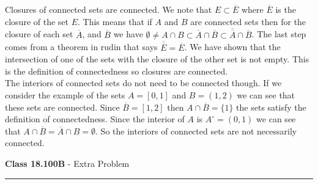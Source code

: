 \documentclass[11pt,reqno]{article}
\begin{document}
Closures of connected sets are connected. We note that  $E \subset \overline{E}$ where $\overline{E}$ is the closure of the set $E$. This means that if $A$ and $B$ are connected sets then for the closure of each set $\overline{A}$, and $\overline{B}$ we have $\emptyset \neq A \cap B \subset \overline{A} \cap \overline{B} \subset \overline{\overline{A}} \cap \overline{B}$. The last step comes from a theorem in rudin that says $\overline{\overline{E}} = \overline{E}$. We have shown that the intersection of one of the sets with the closure of the other set is not empty. This is the definition of connectedness so closures are connected.\\
\indent The interiors of connected sets do not need to be connected though. If we consider the example of the sets $A = [ 0, 1 ]$ and $B = (1,2)$ we can see that these sets are connected. Since $\overline{B} = [ 1,2 ]$ then $A \cap \overline{B} = \{ 1 \}$ the sets satisfy the definition of connectedness. Since the interior of $A$ is $A^\circ = (0,1)$ we can see that $A \cap \overline{B} = \overline{A} \cap B = \emptyset $. So the interiors of connected sets are not necessarily connected.

\vspace{15pt}
\begin{flushleft} 
\textbf{Class 18.100B} - Extra Problem \\
\rule{500pt}{1pt}\\
\end{flushleft} 
\end{document}
